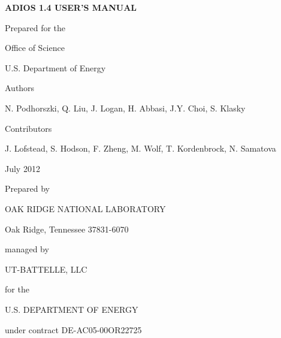 \begin{center}
{\Large \textbf{ADIOS 1.4 USER'S MANUAL}}

\vspace{60pt}
Prepared for the

Office of Science

U.S. Department of Energy

\vspace{60pt}
Authors

\vspace{6pt}
N. Podhorszki, Q. Liu, J. Logan, H. Abbasi, J.Y. Choi, S. Klasky

\vspace{30pt}
Contributors 

\vspace{6pt}
J. Lofstead, S. Hodson, F. Zheng, M. Wolf, T. Kordenbrock, N. Samatova

\vspace{72pt}
July 2012

\vspace{72pt}
Prepared by

OAK RIDGE NATIONAL LABORATORY

Oak Ridge, Tennessee 37831-6070

managed by

UT-BATTELLE, LLC

for the

U.S. DEPARTMENT OF ENERGY

under contract DE-AC05-00OR22725

\end{center}


\newpage

\tableofcontents


\newpage

\listoffigures


\newpage

